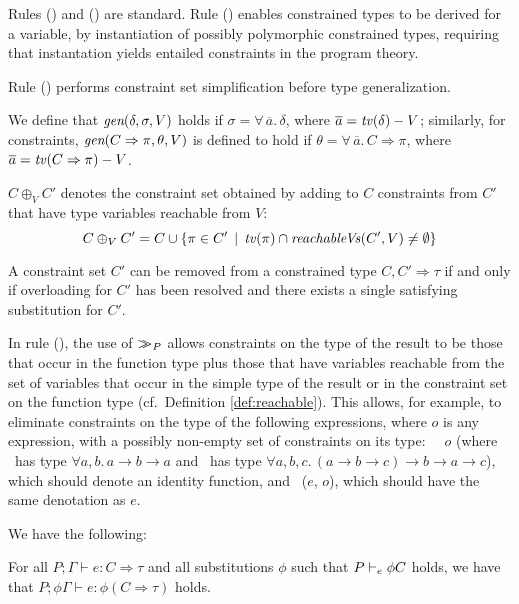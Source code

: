 Rules (\VAR) and (\ABS) are standard. Rule (\VAR) enables constrained
types to be derived for a variable, by instantiation of possibly
polymorphic constrained types, requiring that instantation yields
entailed constraints in the program theory.

Rule (\LET) performs constraint set simplification before type
generalization.

We define that $\mbox{\it gen}(\delta,\sigma,V)$ holds if
$\sigma=\forall\,\overline{a}.\,\delta$, where
$\overline{a}={\it tv\/}(\delta) - V$; similarly, for constraints,
$\mbox{\it gen}(C\Rightarrow\pi,\theta,V)$ is defined to hold if
$\theta=\forall\,\overline{a}.\,C\Rightarrow\pi$, where
$\overline{a}={\it tv\/}(C\Rightarrow\pi) - V$.

$C \oplus_V C'$ denotes the constraint set obtained by adding to $C$
constraints from $C'$ that have type variables reachable from $V$:
  \[ C \oplus_V C' = C \cup \{ \pi \in C'\,\mid\, {\it tv\/}(\pi) \cap {\it reachableVs\/}(C',V) \not= \emptyset \} \]

A constraint set $C'$ can be removed from a constrained type $C,C'
\Rightarrow \tau$ if and only if overloading for $C'$ has been
resolved and there exists a single satisfying substitution for
$C'$. 

In rule (\APP), the use of $>\!\!\!>_{P}$ allows constraints on the
type of the result to be those that occur in the function type plus
those that have variables reachable from the set of variables that
occur in the simple type of the result or in the constraint set on the
function type (cf.~Definition \ref{def:reachable}).  This allows, for
example, to eliminate constraints on the type of the following
expressions, where $o$ is any expression, with a possibly non-empty
set of constraints on its type: {\tt \flip\ \const\ $o$} (where
\const\ has type $\forall a, b.\,a \rightarrow b \rightarrow a$ and
\flip\ has type $\forall a, b, c.\,(a \rightarrow b \rightarrow c)
\rightarrow b \rightarrow a\rightarrow c$), which should denote an
identity function, and \fst\ ($e$, $o$), which should have the same
denotation as $e$.

We have the following:

\begin{Theorem}[Substituition]
  For all $P;\Gamma \vdash e: C\Rightarrow \tau$ and all substitutions
  $\phi$ such that $P \vdash_e \phi C$ holds, we have that
  $P;\phi\Gamma \vdash e: \phi(C\Rightarrow \tau)$ holds.
 
\label{thm:substitution}
\end{Theorem}

